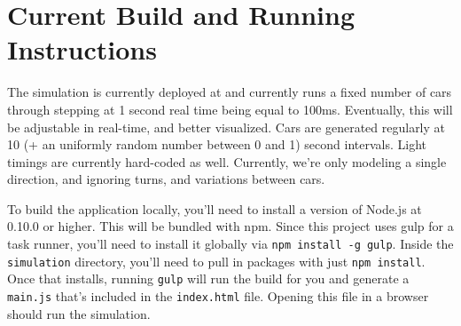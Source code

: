 \documentclass[a4paper,12pt]{article}
\begin{document}
\section{Current Build and Running Instructions}
The simulation is currently deployed at \cite{aprilandchip} and currently runs a fixed number of cars through stepping
at 1 second real time being equal to 100ms. Eventually, this will be adjustable in real-time, and better visualized.
Cars are generated regularly at 10 (+ an uniformly random number between 0 and 1) second intervals. Light timings are
currently hard-coded as well. Currently, we're only modeling a single direction, and ignoring turns, and variations
between cars.

To build the application locally, you'll need to install a version of Node.js \cite{nodejs} at 0.10.0 or higher. This will be bundled
with npm. Since this project uses gulp for a task runner, you'll need to install it globally via
\texttt{npm install -g gulp}. Inside the \texttt{simulation} directory, you'll need to pull in packages with just
\texttt{npm install}. Once that installs, running \texttt{gulp} will run the build for you and generate a
\texttt{main.js} that's included in the \texttt{index.html} file. Opening this file in a browser should run the
simulation.



\end{document}
